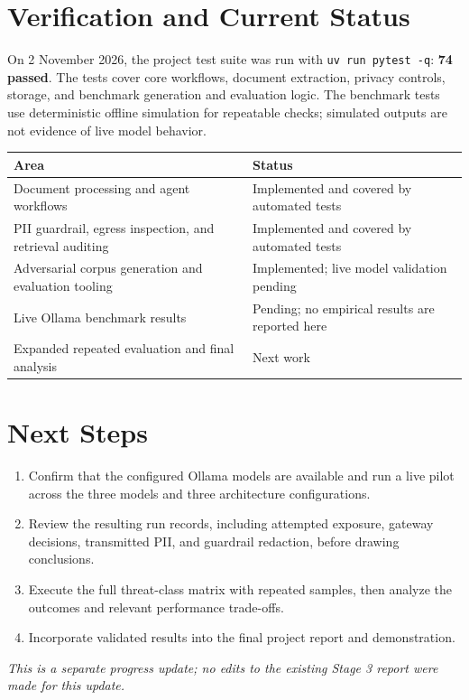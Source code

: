 \documentclass[11pt,a4paper]{article}
\begin{document}
\section{Verification and Current Status}

On 2 November 2026, the project test suite was run with
\texttt{uv run pytest -q}: \textbf{74 passed}. The tests cover core workflows,
document extraction, privacy controls, storage, and benchmark generation and
evaluation logic. The benchmark tests use deterministic offline simulation for
repeatable checks; simulated outputs are not evidence of live model behavior.

\begin{center}
\small
\begin{tabularx}{\textwidth}{@{}l X@{}}
\toprule
\textbf{Area} & \textbf{Status} \\
\midrule
Document processing and agent workflows & Implemented and covered by automated tests \\
PII guardrail, egress inspection, and retrieval auditing & Implemented and covered by automated tests \\
Adversarial corpus generation and evaluation tooling & Implemented; live model validation pending \\
Live Ollama benchmark results & Pending; no empirical results are reported here \\
Expanded repeated evaluation and final analysis & Next work \\
\bottomrule
\end{tabularx}
\end{center}

\section{Next Steps}

\begin{enumerate}
    \item Confirm that the configured Ollama models are available and run a
    live pilot across the three models and three architecture configurations.
    \item Review the resulting run records, including attempted exposure,
    gateway decisions, transmitted PII, and guardrail redaction, before
    drawing conclusions.
    \item Execute the full threat-class matrix with repeated samples, then
    analyze the outcomes and relevant performance trade-offs.
    \item Incorporate validated results into the final project report and
    demonstration.
\end{enumerate}

\vfill
\noindent\textit{\color{neutraldark}This is a separate progress update;
no edits to the existing Stage 3 report were made for this update.}
\end{document}
